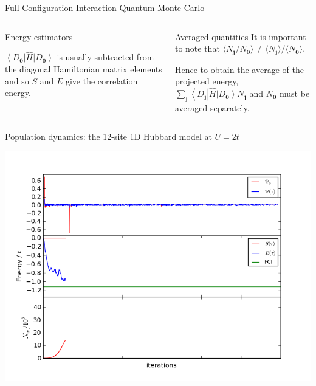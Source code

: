 \documentclass[final]{beamer} %
\newcommand{\ket}[1]{\left\vert#1\right\rangle}
\newcommand{\bra}[1]{\left\langle#1\right\vert}
\newcommand{\mean}[1]{\langle#1\rangle}
\newcommand{\Hamil}{\hat{H}}
\newcommand{\Dz}{D_\mathbf{0}}
\newcommand{\bz}{\mathbf{0}}
\newcommand{\bj}{\mathbf{j}}
\begin{document}
\begin{frame}[t]
\begin{columns}[t]
\begin{column}{0.9\paperwidth}
\begin{block}{Full Configuration Interaction Quantum Monte Carlo}
\begin{columns}[t]
\begin{column}{0.74\paperwidth}
\begin{alertblock}{Energy estimators}
\begin{multicols}{2}
               $\bra{\Dz}\Hamil\ket{\Dz}$ is usually subtracted from the diagonal Hamiltonian matrix elements and so $S$ and $E$ give the correlation energy.
               \end{multicols}
               \vspace{-0.22cm}
               \end{alertblock}
           \end{column}
           \begin{column}{0.16\paperwidth}
               \begin{alertblock}{Averaged quantities}
               It is important to note that $\mean{N_\bj/N_\bz} \ne \mean{N_\bj}/\mean{N_\bz}$.  
               
               Hence to obtain the average of the projected energy, $\sum_\bj \bra{D_\bj}\Hamil\ket{\Dz} N_\bj$ and $N_\bz$ must be averaged separately.
               \end{alertblock}
           \end{column}
       \end{columns}
%
   \end{block}
%
   \begin{block}{Population dynamics: the 12-site 1D Hubbard model at $U=2t$}
       \begin{multicols}{4}
          \includegraphics[width=0.95\linewidth]{step055}


\end{multicols}
\end{block}
\end{column}
\end{columns}
\end{frame}
\end{document}
